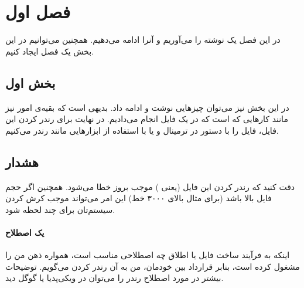 \chapter{فصل اول}
در این فصل یک نوشته را می‌آوریم و آنرا ادامه می‌دهیم. همچنین می‌توانیم در این بخش یک فصل ایجاد کنیم.

\section{بخش اول}
در این بخش نیز می‌توان چیزهایی نوشت و ادامه داد. بدیهی است که بقیه‌ی امور نیز مانند کارهایی که است که در یک فایل انجام می‌دادیم. در نهایت برای رندر کردن این فایل، فایل  را با دستور  در ترمینال و یا با استفاده از ابزارهایی مانند  رندر می‌کنیم.

\section{هشدار}
دقت کنید که رندر کردن این فایل (یعنی ) موجب بروز خطا می‌شود. همچنین اگر حجم فایل بالا باشد (برای مثال بالای ۳۰۰۰ خط) این امر می‌تواند موجب کرش کردن سیستم‌تان برای چند لحظه شود.

\subsubsection{یک اصطلاح}
اینکه به فرآیند ساخت فایل  یا  اطلاق چه اصطلاحی مناسب است، همواره ذهن من را مشغول کرده است، بنابر قرارداد بین خودمان، من به آن رندر کردن می‌گویم. توضیحات بیشتر در مورد اصطلاح رندر  را می‌توان در ویکی‌پدیا یا گوگل دید.